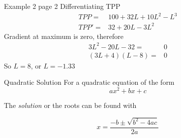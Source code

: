 \documentclass[14pt,xcolor=pdftex,dvipsnames,table]{beamer}
\begin{document}
\begin{frame}{Example 2 page 2}
{Differentiating TPP}
\begin{align*}
TPP  =& 100 + 32L + 10L^2 - L^3\\
TPP' =& 32 +20L -3L^2
\end{align*}
Gradient at maximum is zero, therefore
\begin{align*}
3L^2 - 20L -32 = & 0\\
(3L + 4)(L - 8) =& 0
\end{align*}
So $L = 8$, or $L = -1.33$ 
\end{frame}

\begin{frame}{Quadratic Solution}
For a quadratic equation of the form
\begin{equation*}
ax^2 +bx + c
\end{equation*}

The \emph{solution} or the roots can be found with 
\begin{block}{}
\begin{equation*}
x = \frac{-b \pm \sqrt{b^2 - 4ac}}{2a}
\end{equation*}
\end{block}
\end{frame}
\end{document}
